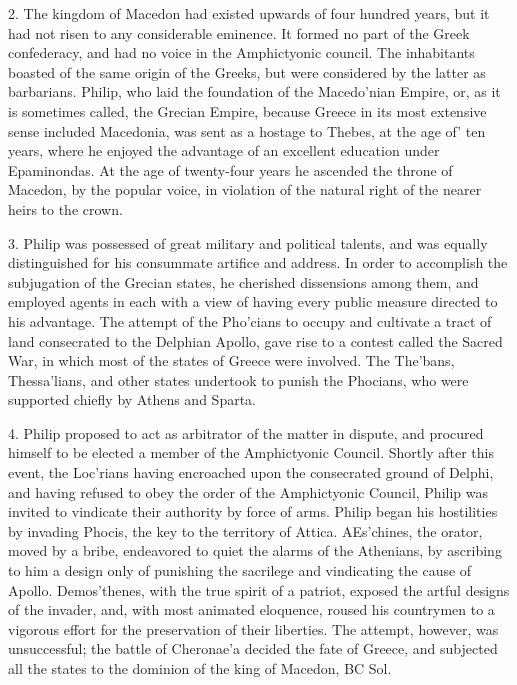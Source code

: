 \documentclass[openany,a4paper]{memoir}
\begin{document}
2. The kingdom of Macedon had existed upwards of four 
hundred years, but it had not risen to any considerable eminence. It formed no part of the Greek confederacy, and had no 
voice in the Amphictyonic council. The inhabitants boasted 
of the same origin of the Greeks, but were considered by the 
latter as barbarians. Philip, who laid the foundation of the 
Macedo'nian Empire, or, as it is sometimes called, the Grecian 
Empire, because Greece in its most extensive sense included 
Macedonia, was sent as a hostage to Thebes, at the age of' 
ten years, where he enjoyed the advantage of an excellent education under Epaminondas. At the age of twenty-four years 
he ascended the throne of Macedon, by the popular voice, in 
violation of the natural right of the nearer heirs to the crown. 

3. Philip was possessed of great military and political 
talents, and was equally distinguished for his consummate 
artifice and address. In order to accomplish the subjugation 
of the Grecian states, he cherished dissensions among them, 
and employed agents in each with a view of having every 
public measure directed to his advantage. The attempt of 
the Pho'cians to occupy and cultivate a tract of land consecrated to the Delphian Apollo, gave rise to a contest called 
the Sacred War, in which most of the states of Greece were 
involved. The The'bans, Thessa'lians, and other states undertook to punish the Phocians, who were supported chiefly 
by Athens and Sparta. 

4. Philip proposed to act as arbitrator of the matter in 
dispute, and procured himself to be elected a member of the 
Amphictyonic Council. Shortly after this event, the Loc'rians 
having encroached upon the consecrated ground of Delphi, 
and having refused to obey the order of the Amphictyonic 
Council, Philip was invited to vindicate their authority by 
force of arms. Philip began his hostilities by invading 
Phocis, the key to the territory of Attica. AEs'chines, the 
orator, moved by a bribe, endeavored to quiet the alarms of 
the Athenians, by ascribing to him a design only of punishing the sacrilege and vindicating the cause of Apollo. Demos'thenes, with the true spirit of a patriot, exposed the 
artful designs of the invader, and, with most animated eloquence, roused his countrymen to a vigorous effort for the 
preservation of their liberties. The attempt, however, was 
unsuccessful; the battle of Cheronae'a decided the fate of 
Greece, and subjected all the states to the dominion of the 
king of Macedon, BC Sol. 
\end{document}
